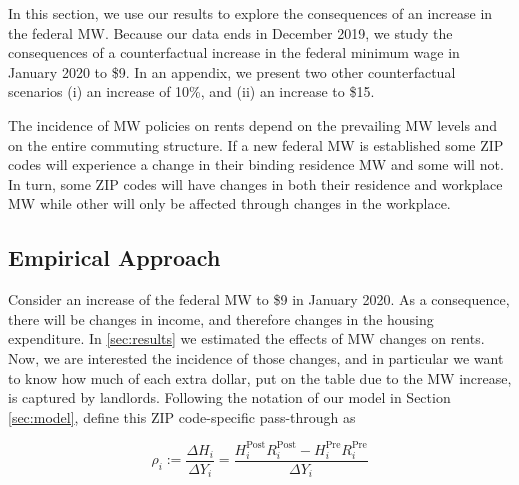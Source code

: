 
In this section, we use our results to explore the consequences of an increase
in the federal MW.
Because our data ends in December 2019, we study the consequences of a 
counterfactual increase in the federal minimum wage in January 2020 to \$9. 
In an appendix, we present two other counterfactual scenarios (i) an increase of 10\%, 
and (ii) an increase to \$15. 


The incidence of MW policies on rents depend on the prevailing MW levels and on
the entire commuting structure. If a new federal MW is established some ZIP 
codes will experience a change in their binding residence MW and some will not. In turn, 
some ZIP codes will have changes in both their residence and workplace MW while other 
will only be affected through changes in the workplace.



\subsection{Empirical Approach}\label{sec:emp_cf}

Consider an increase of the federal MW to \$9 in January 2020. As a consequence, there 
will be changes in income, and therefore changes in the housing expenditure.
In \ref{sec:results} we estimated the effects of MW changes on rents. Now, we are interested 
the incidence of those changes, and in particular we want to know how much of each extra 
dollar, put on the table due to the MW increase, is captured by landlords. Following the 
notation of our model in Section \ref{sec:model}, define this ZIP code-specific pass-through 
as

\begin{equation*}\label{eq:pass_through}
    \rho_i := \frac{\Delta H_i}{\Delta Y_i} 
            = \frac{H^{\text{Post}}_i R^{\text{Post}}_i - H^{\text{Pre}}_i R^{\text{Pre}}_i}{\Delta Y_i}
\end{equation*}

